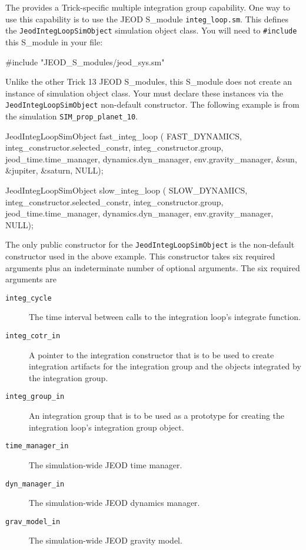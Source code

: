The \ModelDesc provides a Trick-specific multiple integration group capability.
One way to use this capability is to use the JEOD S\_module
\verb|integ_loop.sm|. This defines the
\verb|JeodIntegLoopSimObject| simulation object class.
You will need to \verb|#include| this S\_module in your \Sdefine file:
\begin{codeblock}
#include "JEOD_S_modules/jeod_sys.sm"
\end{codeblock}
Unlike the other Trick 13 JEOD S\_modules,
this S\_module does not create an instance of simulation object class.
Your \Sdefine must declare these instances via
the  \verb|JeodIntegLoopSimObject| non-default constructor.
The following example is from the
 simulation \verb|SIM_prop_planet_10|.
\begin{codeblock}
JeodIntegLoopSimObject fast_integ_loop (
   FAST_DYNAMICS,
   integ_constructor.selected_constr, integ_constructor.group,
   jeod_time.time_manager, dynamics.dyn_manager, env.gravity_manager,
   &sun, &jupiter, &saturn, NULL);

JeodIntegLoopSimObject slow_integ_loop (
   SLOW_DYNAMICS,
   integ_constructor.selected_constr, integ_constructor.group,
   jeod_time.time_manager, dynamics.dyn_manager, env.gravity_manager,
   NULL);
\end{codeblock}

The only public constructor for the \verb|JeodIntegLoopSimObject| is the
non-default constructor used in the above example. This constructor takes
six required arguments plus an indeterminate number of optional arguments.
The six required arguments are\begin{description}
\item[{\tt integ\_cycle}]
The time interval between calls to the integration loop's integrate function.

\item[{\tt integ\_cotr\_in}]
A pointer to the integration constructor that is to be used to create
integration artifacts for the integration group and the objects integrated
by the integration group.

\item[{\tt integ\_group\_in}]
An integration group that is to be used as a prototype for creating the
integration loop's integration group object.

\item[{\tt time\_manager\_in}]
The simulation-wide JEOD time manager.

\item[{\tt dyn\_manager\_in}]
The simulation-wide JEOD dynamics manager.

\item[{\tt grav\_model\_in}]
The simulation-wide JEOD gravity model.
\end{description}

